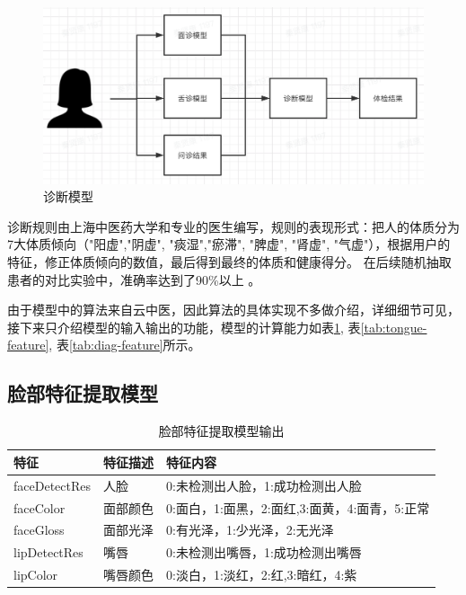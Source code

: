 \begin{figure}[ht]
    \centering
    \includegraphics[width=15cm]{images/model2.png}
    \caption{诊断模型}
    \label{fig:my_model2}
\end{figure}
诊断规则由上海中医药大学和专业的医生编写，规则的表现形式：把人的体质分为7大体质倾向（"阳虚","阴虚", "痰湿","瘀滞", "脾虚", "肾虚", "气虚"），根据用户的特征，修正体质倾向的数值，最后得到最终的体质和健康得分。
在后续随机抽取患者的对比实验中，准确率达到了90\%以上 \cite{Zhang2018Study}。

由于模型中的算法来自云中医，因此算法的具体实现不多做介绍，详细细节可见\cite{Zhang2018Study, Qiu2015Adaptive, Hu2016Robust}，接下来只介绍模型的输入输出的功能，模型的计算能力如表\ref{tab:face-feature}, 表\ref{tab:tongue-feature}, 表\ref{tab:diag-feature}所示。
\subsection{脸部特征提取模型}

\begin{table}[h]
    \centering
    \begin{tabular}{lll}
        \toprule
        特征          & 特征描述     & 特征内容 \\ 
        \midrule
        faceDetectRes & 人脸   & 0:未检测出人脸，1:成功检测出人脸  \\
        faceColor     & 面部颜色 & 0:面白，1:面黑，2:面红,3:面黄，4:面青，5:正常 \\
        faceGloss     & 面部光泽 & 0:有光泽，1:少光泽，2:无光泽\\
        lipDetectRes  & 嘴唇   & 0:未检测出嘴唇，1:成功检测出嘴唇\\
        lipColor      & 嘴唇颜色 & 0:淡白，1:淡红，2:红,3:暗红，4:紫   \\
        \bottomrule
    \end{tabular}
    \caption{脸部特征提取模型输出}
    \label{tab:face-feature}
\end{table}

